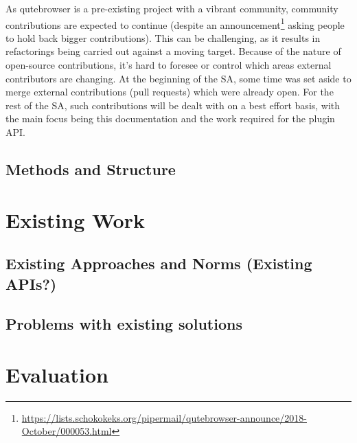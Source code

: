 \documentclass[a4paper,parskip=full]{scrreprt}
\begin{document}
As qutebrowser is a pre-existing project with a vibrant community, community
contributions are expected to continue (despite an
announcement\footnote{\url{https://lists.schokokeks.org/pipermail/qutebrowser-announce/2018-October/000053.html}}
asking people to hold back bigger contributions). This can be challenging,
as it results in refactorings being carried out against a moving target. Because
of the nature of open-source contributions,
it's hard to foresee or control which areas external contributors are changing.
At the beginning of the SA, some time was set aside to merge external
contributions (pull requests) which were already open. For the rest of the SA,
such contributions will be dealt with on a best effort basis, with the main
focus being this documentation and the work required for the plugin API.

\section{Methods and Structure}



\chapter{Existing Work}  

\section{Existing Approaches and Norms (Existing APIs?)}


\section{Problems with existing solutions}  


\chapter{Evaluation}
\end{document}
